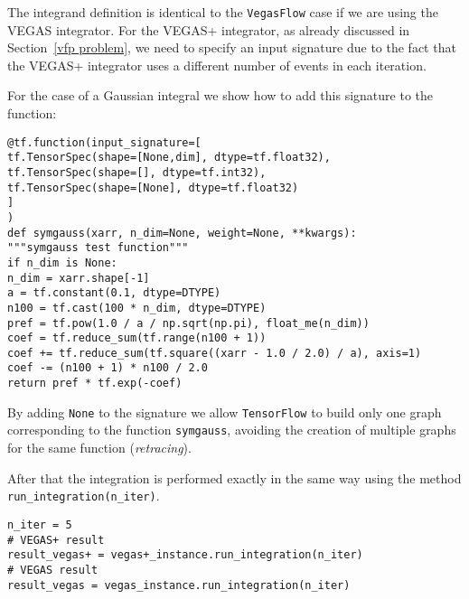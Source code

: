\documentclass[../main/main.tex]{subfiles}
\begin{document}
The integrand definition is identical to the \texttt{VegasFlow} case if we are using the VEGAS integrator. 
For the VEGAS+ integrator, as already discussed in Section~\ref{vfp problem}, we need to specify an input signature due to the fact that the VEGAS+ integrator uses a different number of events in each iteration.

For the case of a Gaussian integral we show how to add this signature to the function:

\begin{verbatim}
@tf.function(input_signature=[
tf.TensorSpec(shape=[None,dim], dtype=tf.float32),
tf.TensorSpec(shape=[], dtype=tf.int32),
tf.TensorSpec(shape=[None], dtype=tf.float32)
]
)
def symgauss(xarr, n_dim=None, weight=None, **kwargs):
"""symgauss test function"""
if n_dim is None:
n_dim = xarr.shape[-1]
a = tf.constant(0.1, dtype=DTYPE)
n100 = tf.cast(100 * n_dim, dtype=DTYPE)
pref = tf.pow(1.0 / a / np.sqrt(np.pi), float_me(n_dim))
coef = tf.reduce_sum(tf.range(n100 + 1))
coef += tf.reduce_sum(tf.square((xarr - 1.0 / 2.0) / a), axis=1)
coef -= (n100 + 1) * n100 / 2.0
return pref * tf.exp(-coef)
\end{verbatim}

By adding \texttt{None} to the signature we allow \texttt{TensorFlow} to build only one graph corresponding to the function \texttt{symgauss}, avoiding the creation of multiple graphs for the same function (\emph{retracing}).

After that the integration is performed exactly in the same way using the method \texttt{run\_integration(n\_iter)}.

\begin{verbatim}
n_iter = 5
# VEGAS+ result
result_vegas+ = vegas+_instance.run_integration(n_iter)
# VEGAS result
result_vegas = vegas_instance.run_integration(n_iter)
\end{verbatim}
\end{document}
